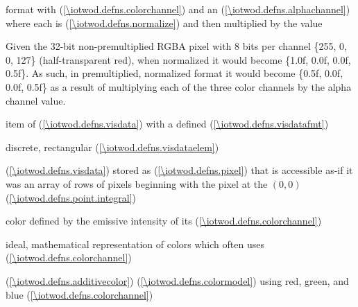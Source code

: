 %
format with  (\ref{\iotwod.defns.colorchannel}) and an  (\ref{\iotwod.defns.alphachannel}) where each  is  (\ref{\iotwod.defns.normalize}) and then multiplied by the   value
\begin{example}
Given the 32-bit non-premultiplied RGBA pixel with 8 bits per channel \{255, 0, 0, 127\} (half-transparent red), when normalized it would become \{1.0f, 0.0f, 0.0f, 0.5f\}. As such, in premultiplied, normalized format it would become \{0.5f, 0.0f, 0.0f, 0.5f\} as a result of multiplying each of the three color channels by the alpha channel value.
\end{example}

%
item of  (\ref{\iotwod.defns.visdata}) with a defined  (\ref{\iotwod.defns.visdatafmt})

discrete, rectangular  (\ref{\iotwod.defns.visdataelem})

%
%
  (\ref{\iotwod.defns.visdata}) stored as  (\ref{\iotwod.defns.pixel}) that is accessible as-if it was an array of rows of pixels beginning with the pixel at the  $(0,0)$ (\ref{\iotwod.defns.point.integral})

%
color defined by the emissive intensity of its  (\ref{\iotwod.defns.colorchannel})

%
ideal, mathematical representation of colors which often uses  (\ref{\iotwod.defns.colorchannel})

%
%
  (\ref{\iotwod.defns.additivecolor})  (\ref{\iotwod.defns.colormodel}) using red, green, and blue  (\ref{\iotwod.defns.colorchannel})

